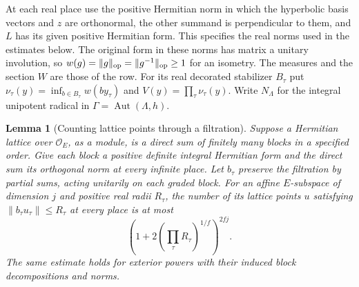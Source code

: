 \documentclass[a4paper,11pt]{article}
\newtheorem{lemma}[proposition]{Lemma}
\theoremstyle{definition}
\theoremstyle{remark}
\numberwithin{equation}{section}
\begin{document}
At each real place use the positive Hermitian norm in which the
hyperbolic basis vectors and \(z\) are orthonormal, the other
summand is perpendicular to them, and \(L\) has its given
positive Hermitian form. This specifies the real norms used in
the estimates below. The original form in these norms has matrix
a unitary involution, so \(w(g)=\|g\|_{\rm op}=\|g^{-1}\|_{\rm op}
\ge1\) for an isometry. The measures and the section \(W\) are
those of the row. For its real decorated stabilizer \(B_\tau\)
put \(\nu_\tau(y)=\inf_{b\in B_\tau}w(by_\tau)\) and
\(V(y)=\prod_\tau\nu_\tau(y)\). Write \(N_\Lambda\) for the
integral unipotent radical in \(\Gamma=\operatorname{Aut}(\Lambda,h)\).

\begin{lemma}[Counting lattice points through a filtration]
\leavevmode\label{lem:gradedpacking552}
Suppose a Hermitian lattice over \(\mathcal O_E\), as a module,
is a direct sum of finitely many blocks in a specified order.
Give each block a positive definite integral Hermitian form and
the direct sum its orthogonal norm at every infinite place.
Let \(b_\tau\) preserve the filtration by partial sums, acting
unitarily on each graded block. For an affine \(E\)-subspace
of dimension \(j\) and positive real radii \(R_\tau\), the
number of its lattice points \(u\) satisfying
\(\|b_\tau u_\tau\|\le R_\tau\) at every place is at most
\[
                \left(1+2(\textstyle\prod_\tau R_\tau)^{1/f}\right)^{2fj}.
\]
The same estimate holds for exterior powers with their induced
block decompositions and norms.
\end{lemma}
\end{document}
